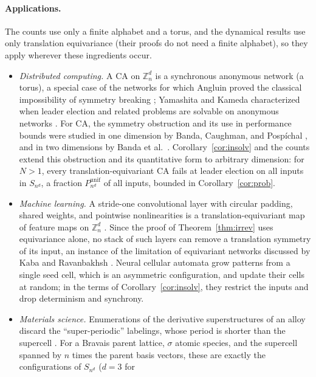 \documentclass[11pt,a4paper]{article}
\theoremstyle{remark}
\newcommand{\ZZ}{\mathbb{Z}}
\begin{document}
\paragraph{Applications.}
The counts use only a finite alphabet and a torus, and the dynamical
results use only translation equivariance (their proofs do not need a finite
alphabet), so they apply wherever these ingredients occur.
\begin{itemize}[leftmargin=*]
    \item \emph{Distributed computing.} A CA on $\ZZ_n^d$ is a synchronous anonymous
    network (a torus), a special case of the networks for which Angluin proved
    the classical impossibility of symmetry breaking \cite{angluin1980};
    Yamashita and Kameda characterized when leader election and related
    problems are solvable on anonymous networks \cite{yamashita1996}.
    For CA, the symmetry obstruction and its use in performance bounds were
    studied in one dimension by Banda, Caughman, and Posp\'ichal
    \cite{banda2015}, and in two dimensions by Banda et al.~\cite{banda2019}.
    Corollary~\ref{cor:insolv} and the counts extend this obstruction and its
    quantitative form to arbitrary dimension: for $N>1$, every translation-equivariant CA
    fails at leader election on all inputs in $S_{n^d}$, a fraction
    $P^{\mathrm{unif}}_{n^d}$ of all inputs, bounded in
    Corollary~\ref{cor:prob}.
    \item \emph{Machine learning.} A stride-one convolutional layer with circular
    padding, shared weights, and pointwise nonlinearities is a
    translation-equivariant map of feature maps on $\ZZ_n^d$ \cite{cohen2016}.
    Since the proof of Theorem~\ref{thm:irrev} uses equivariance alone, no stack
    of such layers can remove a translation symmetry of its input, an instance
    of the limitation of equivariant networks discussed by Kaba and Ravanbakhsh
    \cite{kaba2023}. Neural cellular automata \cite{mordvintsev2020} grow
    patterns from a single seed cell, which is an asymmetric configuration, and
    update their cells at random; in the terms of Corollary~\ref{cor:insolv},
    they restrict the inputs and drop determinism and synchrony.
    \item \emph{Materials science.} Enumerations of the derivative superstructures of
    an alloy discard the ``super-periodic'' labelings, whose period is shorter
    than the supercell \cite{hartforcade2008}. For a Bravais parent lattice,
    $\sigma$ atomic species, and the supercell spanned by $n$ times the parent
    basis vectors, these are exactly the configurations of $S_{n^d}$ ($d=3$ for

\end{itemize}
\end{document}
